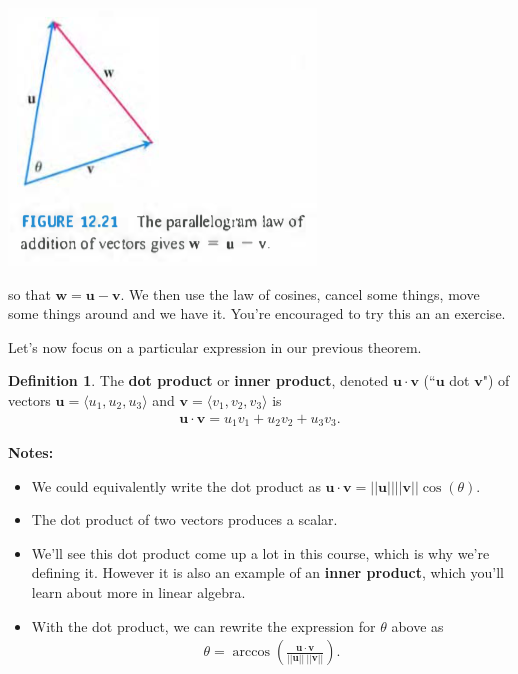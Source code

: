 \documentclass[12pt, letter]{article}
\theoremstyle{plain}
\numberwithin{theorem}{section}
\theoremstyle{definition}
\newtheorem{definition}[theorem]{Definition}
\begin{document}
\bigskip

\begin{center}
\includegraphics[scale=0.8]{m1_f7}
\end{center}

\bigskip

so that $\bm{w}=\bm{u}-\bm{v}$. We then use the law of cosines, cancel some things, move some things around and we have it. You're encouraged to try this an an exercise.

\bigskip

\hrulefill

\bigskip

Let's now focus on a particular expression in our previous theorem.

\bigskip

\begin{definition}
The \textbf{dot product} or \textbf{inner product}, denoted $\bm{u} \cdot \bm{v}$ (``$\bm{u}$ dot $\bm{v}$") of vectors $\bm{u} = \langle u_1, u_2, u_3 \rangle$ and $\bm{v} = \langle v_1, v_2, v_3 \rangle$ is
\begin{align*}
\bm{u} \cdot \bm{v} = u_1v_1 + u_2v_2 + u_3v_3.
\end{align*}
\end{definition}

\bigskip

\textbf{Notes:}
\begin{itemize}
\item We could equivalently write the dot product as $\bm{u}\cdot\bm{v} = ||\bm{u}||||\bm{v}||\cos(\theta)$.
\item The dot product of two vectors produces a scalar.
\item We'll see this dot product come up a lot in this course, which is why we're defining it. However it is also an example of an \textbf{inner product}, which you'll learn about more in linear algebra.
\item With the dot product, we can rewrite the expression for $\theta$ above as
\begin{align*}
\theta = \arccos\left(\frac{\bm{u}\cdot\bm{v}}{||\bm{u}|| \ ||\bm{v}||}\right).
\end{align*}
\end{itemize}
\end{document}
